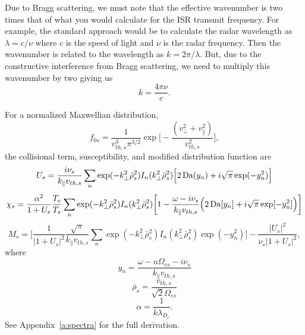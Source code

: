 Due to Bragg scattering, we must note that the effective wavenumber is two times that of what you would calculate for the ISR transmit frequency.
For example, the standard approach would be to calculate the radar wavelength as $\lambda=c/\nu$ where $c$ is the speed of light and $\nu$ is the radar frequency.
Then the wavenumber is related to the wavelength as $k=2\pi/\lambda$. 
But, due to the constructive interference from Bragg scattering, we need to multiply this wavenumber by two giving us 
\begin{equation}
	k = \frac{4\pi \nu}{c}.
	\label{eq:k}
\end{equation}


For a normalized Maxwellian distribution,
\begin{equation}
	f_{0s} = 
	\frac{1}{v_{th,s}^3\pi^{3/2}}
	\exp\bigg[- \frac{(v_\perp^2 + v_\parallel^2)}{v_{th,s}^2} \bigg],
\end{equation}
the collisional term, susceptibility, and modified distribution function are
\begin{equation}
	U_s = 
	\frac{i \nu_{s}}{k_\parallel v_{th,s}} 
	\sum_n \exp(-k_\perp^2 \bar{\rho}_s^2) I_n (k_\perp^2 \bar{\rho}_s^2) 
	\Big[ 2 \operatorname{Da}(y_n) + i \sqrt{\pi} \exp(-y_n^2) \Big]
	\label{eq:Us_exact}
\end{equation}
\begin{equation}
	\chi_s = 
	\frac{\alpha^2}{1+U_s} \frac{T_e}{T_s} 
	\sum_n \exp(-k_\perp^2 \bar{\rho}_s^2) I_n (k_\perp^2 \bar{\rho}_s^2) 
	\bigg[ 1 - \frac{\omega-i\nu_s}{k_\parallel v_{th,s}} 
	\Big( 2 \operatorname{Da}[y_n] + i \sqrt{\pi} \exp[-y_n^2] \Big)
	\bigg]
	\label{eq:chis_exact}
\end{equation}
\begin{equation}
	M_s = 
	\Bigg[
	\frac{1}{|1+U_s|^2} \frac{\sqrt{\pi}}{k_\parallel v_{th,s}}
	\sum_n \exp(-k_\perp^2 \bar{\rho}_s^2) I_n (k_\perp^2 \bar{\rho}_s^2) \exp(-y_n^2)
	\Bigg]
	- \frac{|U_s|^2}{\nu_s |1+U_s|^2},
\end{equation}
where
\begin{equation}
	y_n = \frac{\omega-n\Omega_{cs}-i\nu_s}{k_\parallel v_{th,s}}
\end{equation}
\begin{equation}
	\bar{\rho}_s = \frac{v_{th,s}}{\sqrt{2}\Omega_{cs}}
\end{equation}
\begin{equation}
	\alpha = \frac{1}{k \lambda_{D_e}}.
\end{equation}
See Appendix~\ref{a:spectra} for the full derivation.


